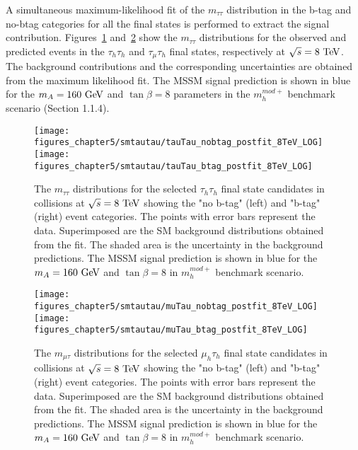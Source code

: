 A simultaneous maximum-likelihood fit of the $m_{\tau\tau}$ distribution in the b-tag and no-btag categories for all the final states is performed to extract the signal contribution. Figures~\ref{fig:mssmtauhtauh} and~\ref{fig:mssmmutauh} show the $m_{\tau\tau}$ distributions for the observed and predicted events in the $\tau_h\tau_h$ and $\tau_{\mu}\tau_h$ final states, respectively at $\sqrt{s}=8~\mathrm{Te\kern -0.1em V}$.  The background contributions and the corresponding uncertainties are obtained from the maximum likelihood fit. The MSSM signal prediction is shown in blue for the $m_{A}=160~\mathrm{Ge\kern -0.1em V}$ and $\tan\beta = 8$ parameters in the $m_{h}^{mod+}$ benchmark scenario (Section 1.1.4). 
\begin{figure}[htbp]
\centering
\texttt{[image: figures\_chapter5/smtautau/tauTau\_nobtag\_postfit\_8TeV\_LOG]}
\texttt{[image: figures\_chapter5/smtautau/tauTau\_btag\_postfit\_8TeV\_LOG]}
\caption{The $m_{\tau\tau}$ distributions for the selected $\tau_{h}\tau_{h}$ final state candidates in collisions at $\sqrt{s}=8~\mathrm{Te\kern -0.1em V}$ showing the "no b-tag" (left) and "b-tag" (right) event categories. The points with error bars represent the data. Superimposed are the SM background distributions obtained from the fit. The shaded area is the uncertainty in the background predictions. The MSSM signal prediction is shown in blue for the $m_{A}=160~\mathrm{Ge\kern -0.1em V}$ and $\tan \beta=8$ in $m_{h}^{mod+}$ benchmark scenario.}
\label{fig:mssmtauhtauh}
\end{figure}
\begin{figure}[htbp]
\centering
\texttt{[image: figures\_chapter5/smtautau/muTau\_nobtag\_postfit\_8TeV\_LOG]}
\texttt{[image: figures\_chapter5/smtautau/muTau\_btag\_postfit\_8TeV\_LOG]}
\caption{The $m_{\mu\tau}$ distributions for the selected $\mu_{h}\tau_{h}$ final state candidates in collisions at $\sqrt{s}=8~\mathrm{Te\kern -0.1em V}$ showing the "no b-tag" (left) and "b-tag" (right) event categories. The points with error bars represent the data. Superimposed are the SM background distributions obtained from the fit. The shaded area is the uncertainty in the background predictions. The MSSM signal prediction is shown in blue for the $m_{A}=160~\mathrm{Ge\kern -0.1em V}$ and $\tan \beta=8$ in $m_{h}^{mod+}$ benchmark scenario.}
\label{fig:mssmmutauh}
\end{figure}

